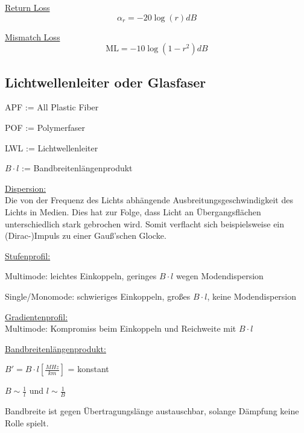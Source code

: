 \underline{Return Loss}
\[
	\alpha_r = -20\log(r)dB
\]

\underline{Mismatch Loss}
\[
	\mathrm{ML} = -10\log(1-r^2)dB
\]

\subsection{Lichtwellenleiter oder Glasfaser}
\begin{description}
	\setlength\itemsep{1pt}
	\item APF := All Plastic Fiber
	\item POF := Polymerfaser
	\item LWL := Lichtwellenleiter
	\item $B\cdot l$ := Bandbreitenlängenprodukt
\end{description}

\begin{description}
	\item \underline{Dispersion:}\\
	      {\small Die von der Frequenz des Lichts abhängende
	      Ausbreitungsgeschwindigkeit des Lichts in Medien. Dies hat zur Folge,
	      dass Licht an Übergangsflächen unterschiedlich stark gebrochen wird.
	      Somit verflacht sich beispielsweise ein (Dirac-)Impuls zu einer Gauß'schen
	      Glocke.
	      }

	\item \underline{Stufenprofil:}\\
	      {\small Multimode: leichtes Einkoppeln, geringes $B\cdot l$ wegen
	      Modendispersion

	      Single/Monomode: schwieriges Einkoppeln, großes $B\cdot l$, keine
	      Modendispersion
	      }

	\item \underline{Gradientenprofil:}\\
	      {\small Multimode: Kompromiss beim Einkoppeln und Reichweite mit $B\cdot l$}

	\item \underline{Bandbreitenlängenprodukt:}\\
	      {\small $B' =  B\cdot l[\frac{MHz}{km}]$ = konstant

	      $B \sim \frac{1}{l}$ und $l\sim \frac{1}{B}$

	      Bandbreite ist gegen Übertragungslänge austauschbar, solange
	      Dämpfung keine Rolle spielt.
	      }
\end{description}

